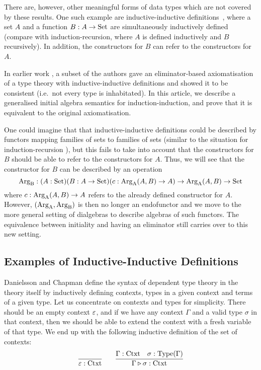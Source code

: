 \documentclass[orivec,envcountsame, ,envcountsect]{llncs}
\begin{document}
There are, however, other meaningful forms of data types which are not
covered by these results. One such example are inductive-inductive
definitions~\cite{nordvallforsbergSetzer2010indind}, where a set $A$
and a function $B : A \to \text{Set}$ are simultaneously inductively defined
(compare with induction-recursion, where $A$ is defined inductively
and $B$ recursively). In addition, the constructors for $B$ can refer
to the constructors for $A$.

In earlier work \cite{nordvallforsbergSetzer2010indind}, a subset of
the authors gave an eliminator-based axiomatisation of a type theory
with inductive-inductive definitions and showed it to be consistent
(i.e.\ not every type is inhabitated). In this article, we describe a
generalised initial algebra semantics for induction-induction, and
prove that it is equivalent to the original axiomatisation.

One could imagine that that inductive-inductive definitions could be
described by functors mapping families of sets to families of sets
(similar to the situation for induction-recursion
\cite{dybjersetzer2003inalg}), but this fails to take into account
that the constructors for $B$ should be able to refer to the
constructors for $A$. Thus, we will see that the constructor for $B$
can be described by an operation
\[
\text{Arg}_{\text{B}} : (A : \text{Set})(B : A \to \text{Set})(c : \text{Arg}_{\text{A}}(A, B) \to A) \to \text{Arg}_{\text{A}}(A, B) \to \text{Set}
\]
where $c : \text{Arg}_{\text{A}}(A, B) \to A$ refers to the already defined
constructor for $A$. However, $(\text{Arg}_{\text{A}}, \text{Arg}_{\text{B}})$ is then no longer an
endofunctor and we move to the more general setting of dialgebras
\cite{hagino1987phdthesis,pollZwanenburg2001dialgebra} to describe
algebras of such functors.
%
The equivalence between initiality and having an eliminator still
carries over to this new setting.


\subsection{Examples of Inductive-Inductive Definitions}
\label{sec:ex-indind}

Danielsson \cite{danielsson2007formalisation} and Chapman
\cite{chapman2009eatitself} define the syntax of dependent type theory
in the theory itself by inductively defining contexts, types in a
given context and terms of a given type. Let us concentrate on
contexts and types for simplicity. There should be an empty
context $\varepsilon$, and if we have any context $\Gamma$ and a valid
type $\sigma$ in that context, then we should be able to extend the
context with a fresh variable of that type. We end up with the
following inductive definition of the set of contexts:
\[
\infer{\emptyCtxt : \Ctxt}{} \qquad
\infer{\consCtxt{\Gamma}{\sigma} : \Ctxt}{\Gamma : \Ctxt & \sigma : \Type(\Gamma)}
\]
\end{document}
